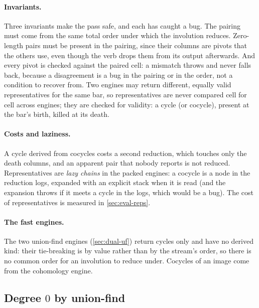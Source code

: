 \paragraph{Invariants.}
Three invariants make the pass safe, and each has caught a bug. The pairing must come from the same total order under which
the involution reduces. Zero-length pairs must be present in the pairing, since their columns are pivots that the others use,
even though the verb drops them from its output afterwards. And every pivot is checked against the paired cell: a mismatch
throws and never falls back, because a disagreement is a bug in the pairing or in the order, not a condition to recover from.
Two engines may return different, equally valid representatives for the same bar, so representatives are never compared cell
for cell across engines; they are checked for validity: a cycle (or cocycle), present at the bar's birth, killed at its death.

\paragraph{Costs and laziness.}
A cycle derived from cocycles costs a second reduction, which touches only the death columns, and an apparent pair that
nobody reports is not reduced. Representatives are \emph{lazy chains} in the packed engines: a cocycle is a node in the
reduction logs, expanded with an explicit stack when it is read (and the expansion throws if it meets a cycle in the logs,
which would be a bug). The cost of representatives is measured in \cref{sec:eval-reps}.

\paragraph{The fast engines.}
The two union-find engines (\cref{sec:dual-uf}) return cycles only and have no derived kind: their tie-breaking is by value
rather than by the stream's order, so there is no common order for an involution to reduce under. Cocycles of an image
come from the cohomology engine.

\subsection{Degree $0$ by union-find}\label{sec:h0}

